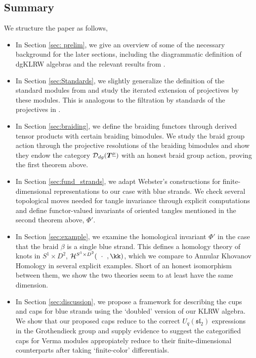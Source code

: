 \documentclass{article}
\begin{document}
\subsection*{Summary}
We structure the paper as follows, 
\begin{itemize}
    \item In Section \ref{sec: prelim}, we give an overview of some of the necessary background for the later sections, including the diagrammatic definition of dgKLRW algebras and the relevant results from \cite{Na}. 
    \item In Section \ref{sec:Standards}, we slightly generalize the definition of the standard modules from \cite{Na} and study the iterated extension of projectives by these modules. This is analogous to the filtration by standards of the projectives in \cite{Web}. 
    \item In Section \ref{sec:braiding}, we define the braiding functors through derived tensor products with certain braiding bimodules. We study the braid group action through the projective resolutions of the braiding bimodules and show they endow the category $\mathcal{D}_{dg}({\boldsymbol{T}}^{\underline{\mu}})$ with an honest braid group action, proving the first theorem above.
    \item In Section \ref{sec:fund_strands}, we adapt Webster's constructions for finite-dimensional representations to our case with blue strands. We check several topological moves needed for tangle invariance through explicit computations and define functor-valued invariants of oriented tangles mentioned in the second theorem above, $\Phi'$. 
    \item In Section \ref{sec:example}, we examine the homological invariant $\Phi'$ in the case that the braid $\beta$ is a single blue strand. This defines a homology theory of knots in $S^1\times D^2$, $\mathcal{H}^{S^1\times D^2}(\hspace{2mm}\cdot \hspace{2mm},\kk) $, which we compare to Annular Khovanov Homology in several explicit examples. Short of an honest isomorphism between them, we show the two theories seem to at least have the same dimension. 
    \item In Section \ref{sec:discussion}, we propose a framework for describing the cups and caps for blue strands using the `doubled' version of our KLRW algebra. We show that our proposed caps reduce to the correct $U_q(\mathfrak{sl}_2)$ expressions in the Grothendieck group and supply evidence to suggest the categorified caps for Verma modules appropiately reduce to their finite-dimensional counterparts after taking `finite-color' differentials. 
\end{itemize}
\end{document}
